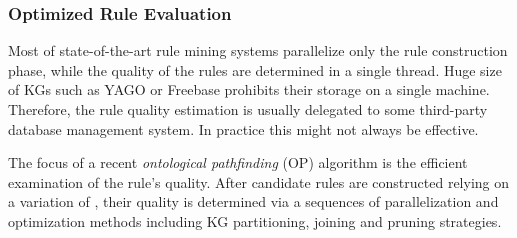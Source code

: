 \subsubsection{Optimized Rule Evaluation}
Most of state-of-the-art rule mining systems parallelize only the rule construction phase, while the quality of the rules are determined in a single thread. Huge size of KGs such as YAGO or Freebase %
prohibits their storage on %
a single machine. Therefore, %
the rule quality estimation %
is usually delegated to some third-party database management system.
In practice this might not always be effective. %

The focus of a recent %
 \emph{ontological pathfinding} (OP) \cite{op} algorithm is %
the efficient examination of the rule's quality. %
After candidate rules are constructed relying on a variation of \cite{DBLP:conf/aaai/RichardsM92}, their quality is determined via a sequences of parallelization and optimization methods including KG partitioning, joining and pruning strategies.




